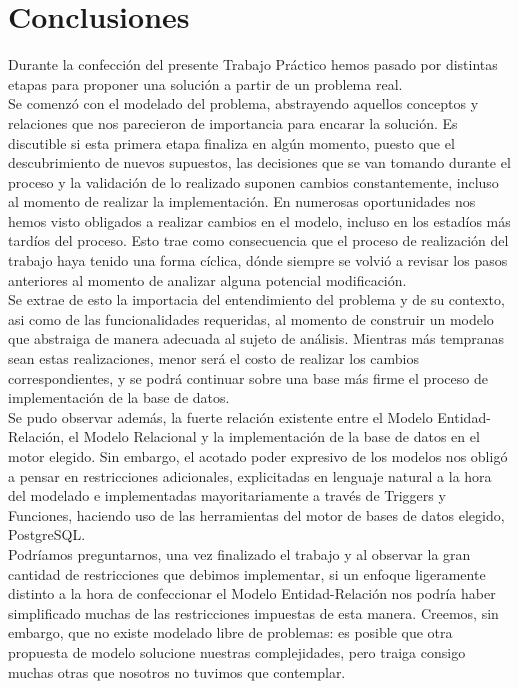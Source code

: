 \section{Conclusiones}

\indent Durante la confección del presente Trabajo Práctico hemos pasado por distintas etapas para proponer una solución a partir de un problema real.\\
\indent Se comenzó con el modelado del problema, abstrayendo aquellos conceptos y relaciones que nos parecieron de importancia para encarar la solución. Es discutible si esta primera etapa finaliza en algún momento, puesto que el descubrimiento de nuevos supuestos, las decisiones que se van tomando durante el proceso y la validación de lo realizado suponen cambios constantemente, incluso al momento de realizar la implementación. En numerosas oportunidades nos hemos visto obligados a realizar cambios en el modelo, incluso en los estadíos más tardíos del proceso. Esto trae como consecuencia que el proceso de realización del trabajo haya tenido una forma cíclica, dónde siempre se volvió a revisar los pasos anteriores al momento de analizar alguna potencial modificación. \\
\indent Se extrae de esto la importacia del entendimiento del problema y de su contexto, asi como de las funcionalidades requeridas, al momento de construir un modelo que abstraiga de manera adecuada al sujeto de análisis. Mientras más tempranas sean estas realizaciones, menor será el costo de realizar los cambios correspondientes, y se podrá continuar sobre una base más firme el proceso de implementación de la base de datos.\\
\indent Se pudo observar además, la fuerte relación existente entre el Modelo Entidad-Relación, el Modelo Relacional y la implementación de la base de datos en el motor elegido. Sin embargo, el acotado poder expresivo de los modelos nos obligó a pensar en restricciones adicionales, explicitadas en lenguaje natural a la hora del modelado e implementadas mayoritariamente a través de Triggers y Funciones, haciendo uso de las herramientas del motor de bases de datos elegido, PostgreSQL.\\
\indent Podríamos preguntarnos, una vez finalizado el trabajo y al observar la gran cantidad de restricciones que debimos implementar, si un enfoque ligeramente distinto a la hora de confeccionar el Modelo Entidad-Relación nos podría haber simplificado muchas de las restricciones impuestas de esta manera. Creemos, sin embargo, que no existe modelado libre de problemas: es posible que otra propuesta de modelo solucione nuestras complejidades, pero traiga consigo muchas otras que nosotros no tuvimos que contemplar.\\   
